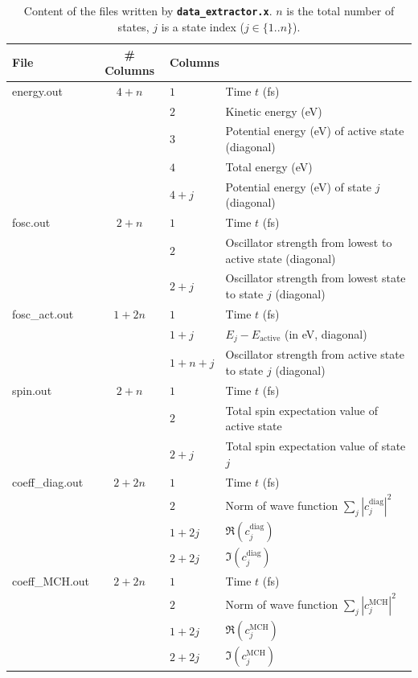 \documentclass[a4paper,10pt,DIV=15,openany,twoside=false]{scrbook}
\newcommand{\ttt}[1]{\textbf{\texttt{#1}}}
\begin{document}
\begin{table}[tbp]
  \centering
  \caption{Content of the files written by \ttt{data\_extractor.x}. $n$ is the total number of states, $j$ is a state index ($j\in\{1..n\}$).}
  \label{tab:outputdata}
  \begin{tabular}{>{\ttfamily}lcll}
    \toprule
    File  &\# Columns     &\multicolumn{2}{l}{Columns}\\
    \midrule
    energy.out       &$4+n$
      &$1$ &Time $t$ (fs)\\
      &&$2$ &Kinetic energy (eV)\\
      &&$3$ &Potential energy (eV) of active state (diagonal)\\
      &&$4$ &Total energy (eV)\\
      &&$4+j$ &Potential energy (eV) of state $j$ (diagonal)\\
    fosc.out       &$2+n$
      &$1$ &Time $t$ (fs)\\
      &&$2$ &Oscillator strength from lowest to active state (diagonal)\\
      &&$2+j$ &Oscillator strength from lowest state to state $j$ (diagonal)\\
    fosc\_act.out       &$1+2n$
      &$1$ &Time $t$ (fs)\\
      &&$1+j$ &$E_j-E_\text{active}$ (in eV, diagonal)\\
      &&$1+n+j$ &Oscillator strength from active state to state $j$ (diagonal)\\
    spin.out       &$2+n$
      &$1$ &Time $t$ (fs)\\
      &&$2$ &Total spin expectation value of active state\\
      &&$2+j$ &Total spin expectation value of state $j$\\
    coeff\_diag.out       &$2+2n$
      &$1$ &Time $t$ (fs)\\
      &&$2$ &Norm of wave function $\sum_j |c_j^{\text{diag}}|^2$\\
      &&$1+2j$ &$\Re (c_j^{\text{diag}})$\\
      &&$2+2j$ &$\Im (c_j^{\text{diag}})$\\
    coeff\_MCH.out       &$2+2n$
      &$1$ &Time $t$ (fs)\\
      &&$2$ &Norm of wave function $\sum_j |c_j^{\text{MCH}}|^2$\\
      &&$1+2j$ &$\Re (c_j^{\text{MCH}})$\\
      &&$2+2j$ &$\Im (c_j^{\text{MCH}})$\\

\end{tabular}
\end{table}
\end{document}
